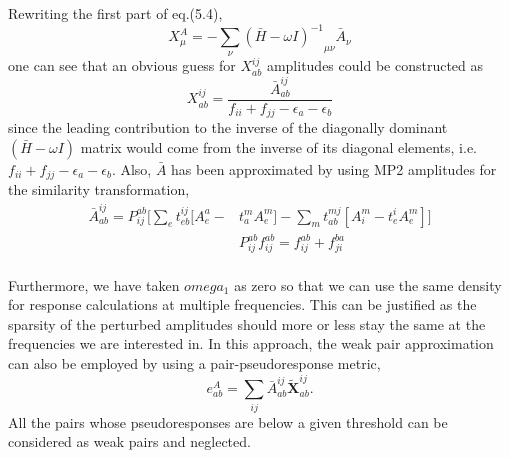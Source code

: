 Rewriting the first part of eq.(5.4),
\begin{equation}
X_{\mu}^{A} = -\sum_{\nu}{{(\bar{H} - \omega I)}^{-1}}_{\mu\nu}\bar{A}_{\nu}
\end{equation}
one can see that an obvious guess for $X^{ij}_{ab}$ amplitudes could be constructed as
\begin{equation}
X^{ij}_{ab} =  \frac{\bar{A}^{ij}_{ab}}{f_{ii} + f_{jj} - \epsilon_a - \epsilon_b} 
\end{equation} 
since the leading contribution to the inverse of the diagonally dominant $(\bar{H} - \omega I)$ matrix 
would come from the inverse of its diagonal elements, i.e. $f_{ii} + f_{jj} - \epsilon_a - \epsilon_b$. 
Also, $\bar{A}$ has been approximated by using MP2 amplitudes for the similarity transformation,
\\
\begin{equation}
\begin{split}
\bar{A}^{ij}_{ab} = P_{ij}^{ab}\bigg[\sum_e t^{ij}_{eb}[A^a_e - & t^m_a A^m_e] -\sum_m t^{mj}_{ab}[A^m_i - t^i_e A^m_e]\bigg] \\
& P_{ij}^{ab} f_{ij}^{ab}  = f_{ij}^{ab} + f_{ji}^{ba}
\end{split}
\end{equation}
\\
Furthermore, we have taken $omega_1$ as zero so that we can use the same density for response calculations at
multiple frequencies. This can be justified as the sparsity of the perturbed amplitudes should more or less
stay the same at the frequencies we are interested in. In this approach, the weak pair approximation can also 
be employed by using a pair-pseudoresponse metric,
\begin{equation}
e^{A}_{ab} =  \sum_{ij} \bar{A}^{ij}_{ab}\bm{\tilde{X}}^{ij}_{ab}.
\end{equation}
All the pairs whose pseudoresponses are below a given threshold can be considered as weak pairs and neglected. 
